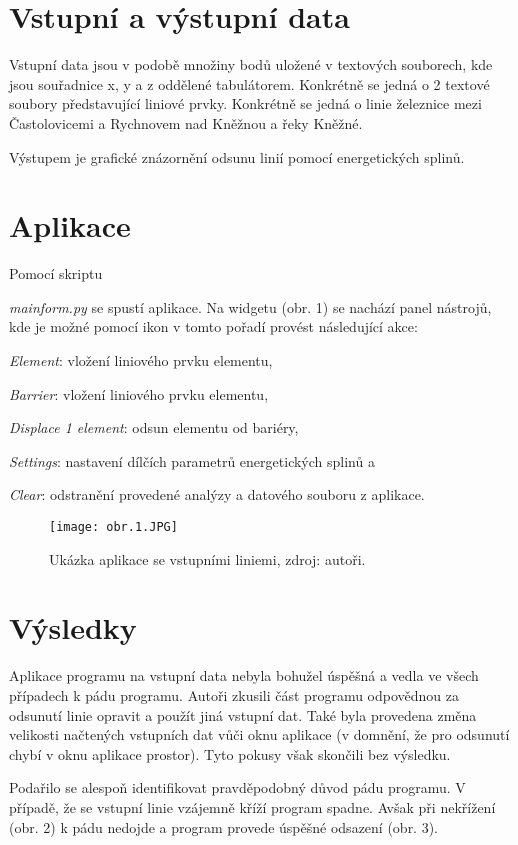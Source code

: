 \documentclass[a4paper,12pt]{article}
\begin{document}
    \section{Vstupní a výstupní data}
     Vstupní data jsou v podobě množiny bodů uložené v textových souborech, kde jsou souřadnice x, y a z oddělené tabulátorem. Konkrétně se jedná o 2 textové soubory představující liniové prvky. Konkrétně se jedná o linie železnice mezi Častolovicemi a Rychnovem nad Kněžnou a řeky Kněžné.

     Výstupem je grafické znázornění odsunu linií pomocí energetických splinů.

    
    \section{Aplikace}
    Pomocí skriptu {\textit{mainform.py} se spustí aplikace. Na widgetu (obr. 1) se nachází panel nástrojů, kde je možné pomocí ikon v tomto pořadí provést následující akce:  {\textit{Element}: vložení liniového prvku elementu, {\textit{Barrier}: vložení liniového prvku elementu, {\textit{Displace 1 element}: odsun elementu od bariéry, {\textit{Settings}: nastavení dílčích parametrů energetických splinů a {\textit{Clear}: odstranění provedené analýzy a datového souboru z aplikace.

    \begin{figure}[htbp]
    \texttt{[image: obr.1.JPG]}
    \centering
    \caption{Ukázka aplikace se vstupními liniemi, zdroj: autoři.}
    \label{fig:obr1}
    \end{figure}

    \newpage
    \section{Výsledky}
    Aplikace programu na vstupní data nebyla bohužel úspěšná a vedla ve všech případech k pádu programu. Autoři zkusili část programu odpovědnou za odsunutí linie opravit a použít jiná vstupní dat. Také byla provedena změna velikosti načtených vstupních dat vůči oknu aplikace (v domnění, že pro odsunutí chybí v oknu aplikace prostor). Tyto pokusy však skončili bez výsledku.
    
    Podařilo se alespoň identifikovat pravděpodobný důvod pádu programu. V případě, že se vstupní linie vzájemně kříží program spadne. Avšak při nekřížení (obr. 2) k pádu nedojde a program provede úspěšné odsazení (obr. 3).

}}}}}}
\end{document}
